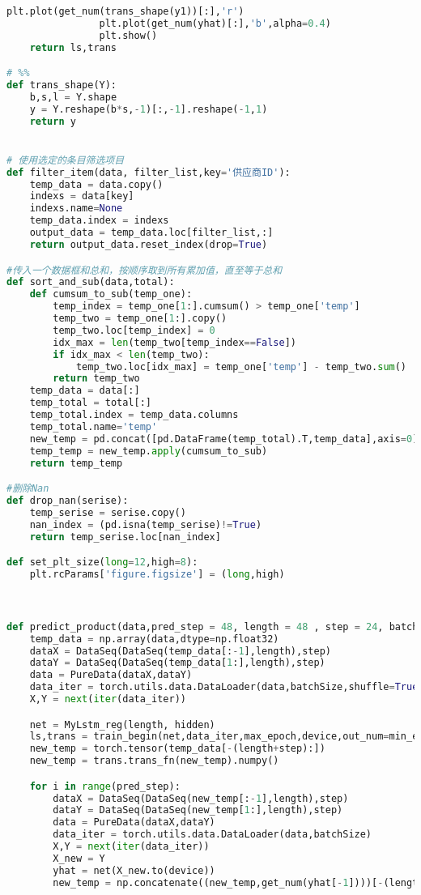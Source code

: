 \begin{appendices}
\begin{lstlisting}[language=python]
                plt.plot(get_num(trans_shape(y1))[:],'r')
                plt.plot(get_num(yhat)[:],'b',alpha=0.4)
                plt.show()
    return ls,trans

# %%
def trans_shape(Y):
    b,s,l = Y.shape
    y = Y.reshape(b*s,-1)[:,-1].reshape(-1,1)
    return y


# 使用选定的条目筛选项目
def filter_item(data, filter_list,key='供应商ID'):
    temp_data = data.copy()
    indexs = data[key]
    indexs.name=None
    temp_data.index = indexs
    output_data = temp_data.loc[filter_list,:]
    return output_data.reset_index(drop=True)

#传入一个数据框和总和，按顺序取到所有累加值，直至等于总和
def sort_and_sub(data,total):
    def cumsum_to_sub(temp_one):
        temp_index = temp_one[1:].cumsum() > temp_one['temp']
        temp_two = temp_one[1:].copy()
        temp_two.loc[temp_index] = 0
        idx_max = len(temp_two[temp_index==False])
        if idx_max < len(temp_two):
            temp_two.loc[idx_max] = temp_one['temp'] - temp_two.sum()
        return temp_two
    temp_data = data[:]
    temp_total = total[:]
    temp_total.index = temp_data.columns
    temp_total.name='temp'
    new_temp = pd.concat([pd.DataFrame(temp_total).T,temp_data],axis=0)
    temp_temp = new_temp.apply(cumsum_to_sub)
    return temp_temp

#删除Nan
def drop_nan(serise):
    temp_serise = serise.copy()
    nan_index = (pd.isna(temp_serise)!=True)
    return temp_serise.loc[nan_index]

def set_plt_size(long=12,high=8):
    plt.rcParams['figure.figsize'] = (long,high)



def predict_product(data,pred_step = 48, length = 48 , step = 24, batchSize = 12, hidden = 256 , max_epoch = 1000, min_epoch = 150, device = 'cpu',show_pic = True):
    temp_data = np.array(data,dtype=np.float32)
    dataX = DataSeq(DataSeq(temp_data[:-1],length),step)
    dataY = DataSeq(DataSeq(temp_data[1:],length),step)
    data = PureData(dataX,dataY)
    data_iter = torch.utils.data.DataLoader(data,batchSize,shuffle=True)
    X,Y = next(iter(data_iter))

    net = MyLstm_reg(length, hidden)
    ls,trans = train_begin(net,data_iter,max_epoch,device,out_num=min_epoch,show_pic=show_pic)
    new_temp = torch.tensor(temp_data[-(length+step):])
    new_temp = trans.trans_fn(new_temp).numpy()

    for i in range(pred_step):
        dataX = DataSeq(DataSeq(new_temp[:-1],length),step)
        dataY = DataSeq(DataSeq(new_temp[1:],length),step)
        data = PureData(dataX,dataY)
        data_iter = torch.utils.data.DataLoader(data,batchSize)
        X,Y = next(iter(data_iter))
        X_new = Y
        yhat = net(X_new.to(device))
        new_temp = np.concatenate((new_temp,get_num(yhat[-1])))[-(length+step):]


\end{lstlisting}
\end{appendices}
